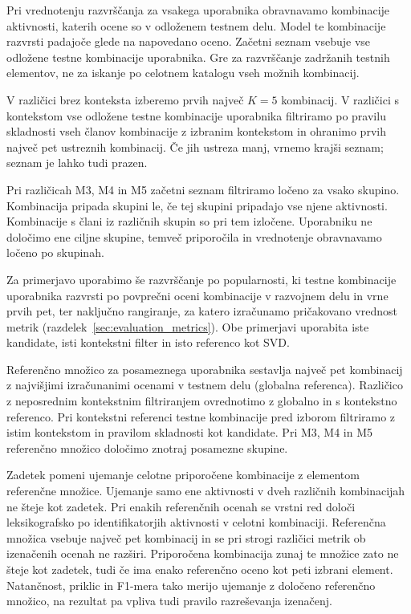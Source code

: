 \documentclass[a4paper,twoside,openright,12pt,slovene]{book}
\begin{document}
Pri vrednotenju razvrščanja za vsakega uporabnika obravnavamo
kombinacije aktivnosti, katerih ocene so v odloženem testnem delu.
Model te kombinacije razvrsti padajoče glede na napovedano oceno.
Začetni seznam vsebuje vse odložene testne kombinacije uporabnika.
Gre za razvrščanje zadržanih testnih elementov, ne za iskanje
po celotnem katalogu vseh možnih kombinacij.

V različici brez konteksta izberemo prvih največ $K=5$ kombinacij.
V različici s kontekstom vse odložene testne kombinacije uporabnika
filtriramo po pravilu skladnosti vseh članov kombinacije z izbranim
kontekstom in ohranimo prvih največ pet ustreznih kombinacij.
Če jih ustreza manj, vrnemo krajši seznam; seznam je lahko tudi prazen.

Pri različicah M3, M4 in M5 začetni seznam filtriramo ločeno
za vsako skupino. Kombinacija pripada skupini le, če tej skupini
pripadajo vse njene aktivnosti. Kombinacije s člani iz različnih
skupin so pri tem izločene. Uporabniku ne določimo ene ciljne
skupine, temveč priporočila in vrednotenje obravnavamo ločeno
po skupinah.

Za primerjavo uporabimo še razvrščanje po popularnosti, ki
testne kombinacije uporabnika razvrsti po povprečni oceni
kombinacije v razvojnem delu in vrne prvih pet, ter naključno
rangiranje, za katero izračunamo pričakovano vrednost metrik
(razdelek~\ref{sec:evaluation_metrics}). Obe primerjavi uporabita iste
kandidate, isti kontekstni filter in isto referenco kot SVD.

Referenčno množico za posameznega uporabnika sestavlja največ
pet kombinacij z najvišjimi izračunanimi ocenami v testnem delu
(globalna referenca). Različico z neposrednim kontekstnim
filtriranjem ovrednotimo z globalno in s kontekstno referenco.
Pri kontekstni referenci testne kombinacije pred izborom
filtriramo z istim kontekstom in pravilom skladnosti kot kandidate.
Pri M3, M4 in M5 referenčno
množico določimo znotraj posamezne skupine.

Zadetek pomeni ujemanje celotne priporočene kombinacije
z elementom referenčne množice. Ujemanje samo ene aktivnosti
v dveh različnih kombinacijah ne šteje kot zadetek.
Pri enakih referenčnih ocenah se vrstni red določi
leksikografsko po identifikatorjih aktivnosti v celotni
kombinaciji. Referenčna množica vsebuje največ pet
kombinacij in se pri strogi različici metrik ob izenačenih
ocenah ne razširi. Priporočena kombinacija zunaj te množice zato ne šteje
kot zadetek, tudi če ima enako referenčno oceno kot
peti izbrani element. Natančnost, priklic in F1-mera
tako merijo ujemanje z določeno referenčno množico,
na rezultat pa vpliva tudi pravilo razreševanja izenačenj.
\end{document}

